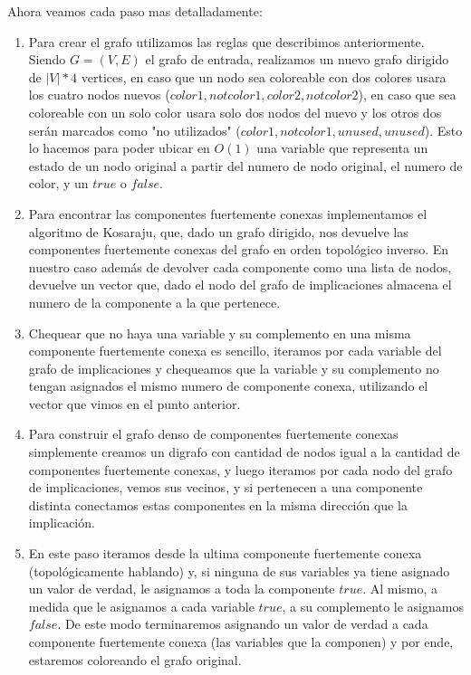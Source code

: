 \documentclass{article}
\theoremstyle{definition}
\theoremstyle{remark}
\begin{document}
Ahora veamos cada paso mas detalladamente:
\begin{enumerate}
\item Para crear el grafo utilizamos las reglas que describimos anteriormente. Siendo $G=(V,E)$ el grafo de entrada, realizamos un nuevo grafo dirigido de $|V|*4$ vertices, en caso que un nodo sea coloreable con dos colores usara los cuatro nodos nuevos  ($color1,notcolor1, color2, notcolor2$), en caso que sea coloreable con un solo color usara solo dos nodos del nuevo y los otros dos serán marcados como "no utilizados" ($color1,notcolor1,unused,unused$). Esto lo hacemos para poder ubicar en $O(1)$ una variable que representa un estado de un nodo original a partir del numero de nodo original, el numero de color, y un $true$ o $false$.
\item Para encontrar las componentes fuertemente conexas implementamos el algoritmo de Kosaraju, que, dado un grafo dirigido, nos devuelve las componentes fuertemente conexas del grafo en orden topológico inverso. En nuestro caso además de devolver cada componente como una lista de nodos, devuelve un vector que, dado el nodo del grafo de implicaciones almacena el numero de la componente a la que pertenece.
\item Chequear que no haya una variable y su complemento en una misma componente fuertemente conexa es sencillo, iteramos por cada variable del grafo de implicaciones y chequeamos que la variable y su complemento no tengan asignados el mismo numero de componente conexa, utilizando el vector que vimos en el punto anterior.
\item Para construir el grafo denso de componentes fuertemente conexas simplemente creamos un digrafo con cantidad de nodos igual a la cantidad de componentes fuertemente conexas, y luego iteramos por cada nodo del grafo de implicaciones, vemos sus vecinos, y si pertenecen a una componente distinta conectamos estas componentes en la misma dirección que la implicación.
\item En este paso iteramos desde la ultima componente fuertemente conexa (topológicamente hablando) y, si ninguna de sus variables ya tiene asignado un valor de verdad, le asignamos a toda la componente $true$. Al mismo, a medida que le asignamos a cada variable $true$, a su complemento le asignamos $false$. De este modo terminaremos asignando un valor de verdad a cada componente fuertemente conexa (las variables que la componen) y por ende, estaremos coloreando el grafo original.
\end{enumerate}
\end{document}
